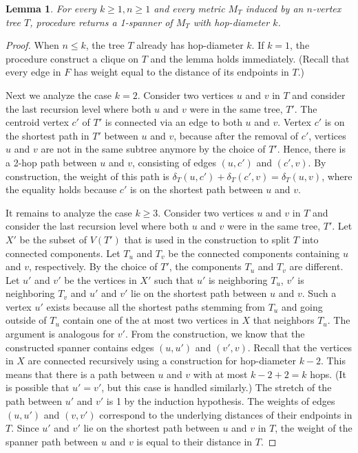 \documentclass[11pt,english]{article}
\newtheorem{lemma}[theorem]{Lemma}
\begin{document}
\begin{lemma}\label{lem:stretch-n-hop}
For every $k \ge 1, n \ge 1$ and every metric $M_T$ induced by an $n$-vertex tree $T$, procedure  returns a 1-spanner of $M_T$ with hop-diameter $k$. 
\end{lemma}
\begin{proof}
When $n \le k$, the tree $T$ already has hop-diameter $k$. If $k=1$, the procedure construct a clique on $T$ and the lemma holds immediately. (Recall that every edge in $F$ has weight equal to the distance of its endpoints in $T$.)

Next we analyze the case $k=2$. Consider two vertices $u$ and $v$ in $T$ and consider the last recursion level where both $u$ and $v$ were in the same tree, $T'$. The centroid vertex $c'$ of $T'$ is connected via an edge to both $u$ and $v$. Vertex $c'$ is on the shortest path in $T'$ between $u$ and $v$, because after the removal of $c'$, vertices $u$ and $v$ are not in the same subtree anymore by the choice of $T'$. Hence, there is a 2-hop path between $u$ and $v$, consisting of edges $(u,c')$ and $(c', v)$. By construction, the weight of this path is $\delta_T(u,c') + \delta_T(c',v) = \delta_T(u,v)$, where the equality holds because $c'$ is on the shortest path between $u$ and $v$.

It remains to analyze the case $k \ge 3$. Consider two vertices $u$ and $v$ in $T$ and consider the last recursion level where both $u$ and $v$ were in the same tree, $T'$. Let $X'$ be the subset of $V(T')$ that is used in the construction to split $T$ into connected components. Let $T_u$ and $T_v$ be the connected components containing $u$ and $v$, respectively. By the choice of $T'$, the components $T_u$ and $T_v$ are different. Let $u'$ and $v'$ be the vertices in $X'$ such that $u'$ is neighboring $T_u$, $v'$ is neighboring $T_v$ and $u'$ and $v'$ lie on the shortest path between $u$ and $v$. Such a vertex $u'$ exists because all the shortest paths stemming from $T_u$ and going outside of $T_u$ contain one of the at most two vertices in $X$ that neighbors $T_u$. The argument is analogous for $v'$. 
From the construction, we know that the constructed spanner contains edges $(u, u')$ and $(v', v)$. Recall that the vertices in $X$ are connected recursively using a construction for hop-diameter $k-2$. This means that there is a path between $u$ and $v$ with at most $k-2+2=k$ hops. (It is possible that $u' = v'$, but this case is handled similarly.) The stretch of the path between $u'$ and $v'$ is 1 by the induction hypothesis. The weights of edges $(u,u')$ and $(v, v')$ correspond to the underlying distances of their endpoints in $T$. Since $u'$ and $v'$ lie on the shortest path between $u$ and $v$ in $T$, the weight of the spanner path between $u$ and $v$ is equal to their distance in $T$.
\end{proof}
\end{document}
